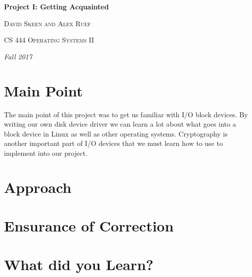 \documentclass[10pt,drafclsnofoot,onecolumn]{article}
\begin{document}
               
\begin{titlepage}
\centering
{\huge\bfseries Project I: Getting Acquainted\par}
\vspace{.5cm}
{\scshape David Skeen and Alex Ruef \par}
\vspace{.5cm}   
{\scshape CS 444 Operating Systems II\par}
\vspace{.5cm} 
{\Large\itshape Fall 2017\par}
\par
\par
\begin{abstract}

\end{abstract}
\end{titlepage}

\section{Main Point}
The main point of this project was to get us familiar with I/O block devices.
By writing our own disk device driver we can learn a lot about what goes into a block device in Linux as well as other operating systems.
Cryptography is another important part of I/O devices that we must learn how to use to implement into our project.

\section{Approach}

\section{Ensurance of Correction}


\section{What did you Learn?}
\end{document}
